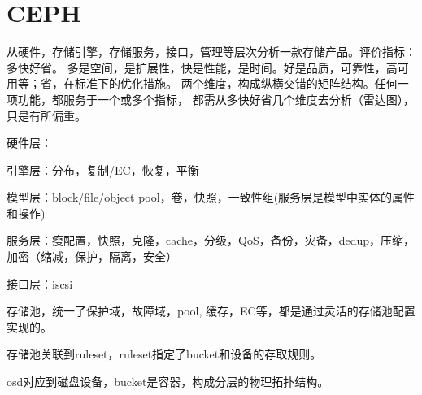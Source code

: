 \chapter{CEPH}

从硬件，存储引擎，存储服务，接口，管理等层次分析一款存储产品。评价指标：多快好省。
多是空间，是扩展性，快是性能，是时间。好是品质，可靠性，高可用等；省，在标准下的优化措施。
两个维度，构成纵横交错的矩阵结构。任何一项功能，都服务于一个或多个指标，
都需从多快好省几个维度去分析（雷达图），只是有所偏重。

硬件层：

引擎层：分布，复制/EC，恢复，平衡

模型层：block/file/object pool，卷，快照，一致性组(服务层是模型中实体的属性和操作)

服务层：瘦配置，快照，克隆，cache，分级，QoS，备份，灾备，dedup，压缩，加密（缩减，保护，隔离，安全）

接口层：iscsi

存储池，统一了保护域，故障域，pool, 缓存，EC等，都是通过灵活的存储池配置实现的。

存储池关联到ruleset，ruleset指定了bucket和设备的存取规则。

osd对应到磁盘设备，bucket是容器，构成分层的物理拓扑结构。
